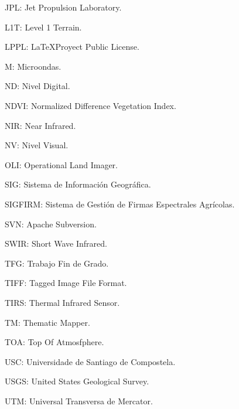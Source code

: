 JPL: Jet Propulsion Laboratory.

L1T: Level 1 Terrain.

LPPL: \LaTeX Proyect Public License.

M: Microondas.

ND: Nivel Digital.

NDVI: Normalized Difference Vegetation Index.

NIR: Near Infrared.

NV: Nivel Visual.

OLI: Operational Land Imager.

SIG: Sistema de Información Geográfica.

SIGFIRM: Sistema de Gestión de Firmas Espectrales Agrícolas.

SVN: Apache Subversion.

SWIR: Short Wave Infrared.

TFG: Trabajo Fin de Grado.

TIFF: Tagged Image File Format.

TIRS: Thermal Infrared Sensor.

TM: Thematic Mapper.

TOA: Top Of Atmosfphere.

USC: Universidade de Santiago de Compostela.

USGS: United States Geological Survey.

UTM: Universal Transversa de Mercator.